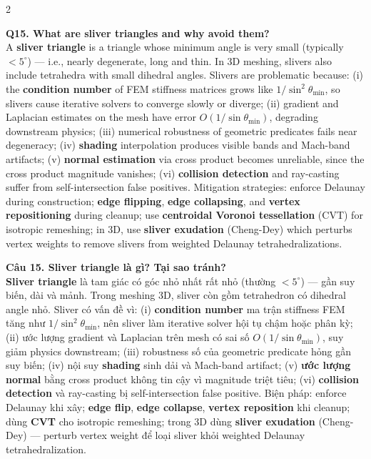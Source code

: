 \begin{paracol}{2}
\switchcolumn*

\textbf{Q15. What are sliver triangles and why avoid them?}\\
A \textbf{sliver triangle} is a triangle whose minimum angle is very small (typically $< 5^\circ$) — i.e., nearly degenerate, long and thin. In 3D meshing, slivers also include tetrahedra with small dihedral angles. Slivers are problematic because: (i) the \textbf{condition number} of FEM stiffness matrices grows like $1/\sin^2\theta_{\min}$, so slivers cause iterative solvers to converge slowly or diverge; (ii) gradient and Laplacian estimates on the mesh have error $O(1/\sin\theta_{\min})$, degrading downstream physics; (iii) numerical robustness of geometric predicates fails near degeneracy; (iv) \textbf{shading} interpolation produces visible bands and Mach-band artifacts; (v) \textbf{normal estimation} via cross product becomes unreliable, since the cross product magnitude vanishes; (vi) \textbf{collision detection} and ray-casting suffer from self-intersection false positives. Mitigation strategies: enforce Delaunay during construction; \textbf{edge flipping}, \textbf{edge collapsing}, and \textbf{vertex repositioning} during cleanup; use \textbf{centroidal Voronoi tessellation} (CVT) for isotropic remeshing; in 3D, use \textbf{sliver exudation} (Cheng-Dey) which perturbs vertex weights to remove slivers from weighted Delaunay tetrahedralizations.

\switchcolumn

\textbf{Câu 15. Sliver triangle là gì? Tại sao tránh?}\\
\textbf{Sliver triangle} là tam giác có góc nhỏ nhất rất nhỏ (thường $< 5^\circ$) — gần suy biến, dài và mảnh. Trong meshing 3D, sliver còn gồm tetrahedron có dihedral angle nhỏ. Sliver có vấn đề vì: (i) \textbf{condition number} ma trận stiffness FEM tăng như $1/\sin^2\theta_{\min}$, nên sliver làm iterative solver hội tụ chậm hoặc phân kỳ; (ii) ước lượng gradient và Laplacian trên mesh có sai số $O(1/\sin\theta_{\min})$, suy giảm physics downstream; (iii) robustness số của geometric predicate hỏng gần suy biến; (iv) nội suy \textbf{shading} sinh dải và Mach-band artifact; (v) \textbf{ước lượng normal} bằng cross product không tin cậy vì magnitude triệt tiêu; (vi) \textbf{collision detection} và ray-casting bị self-intersection false positive. Biện pháp: enforce Delaunay khi xây; \textbf{edge flip}, \textbf{edge collapse}, \textbf{vertex reposition} khi cleanup; dùng \textbf{CVT} cho isotropic remeshing; trong 3D dùng \textbf{sliver exudation} (Cheng-Dey) — perturb vertex weight để loại sliver khỏi weighted Delaunay tetrahedralization.


\end{paracol}
